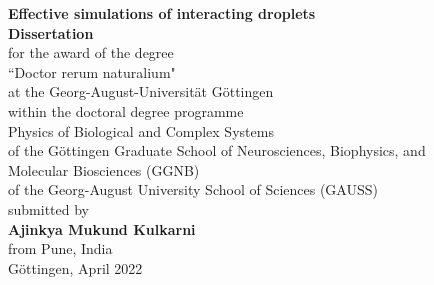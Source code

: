 \documentclass[12pt,oneside]{book}
\begin{document}


\thispagestyle{empty} 
\begin{center}

\vspace*{0cm}
\vspace*{2cm}

\Huge{\textbf{Effective simulations of interacting droplets}}\\[2cm]

\LARGE{\textbf{Dissertation}}\\ [1cm]
\large{for the award of the degree\\ ``Doctor rerum naturalium"\\ at the Georg-August-Universität Göttingen}\\[1cm]
\large{within the doctoral degree programme\\[0.4cm] Physics of Biological and Complex Systems\\ of the G\"{o}ttingen Graduate School of Neurosciences, Biophysics, and \\Molecular Biosciences (GGNB)\\[0.1cm] of the Georg-August University School of Sciences (GAUSS) }\\[2cm]

\large{submitted by}\\[0.5cm] 
\large{\textbf{Ajinkya Mukund Kulkarni}}\\
\vspace{0.1cm}
\large{from Pune, India\\
\vspace{1cm}
G\"{o}ttingen, April 2022}\\

\end{center}

\newpage
\thispagestyle{empty} 
\end{document}

